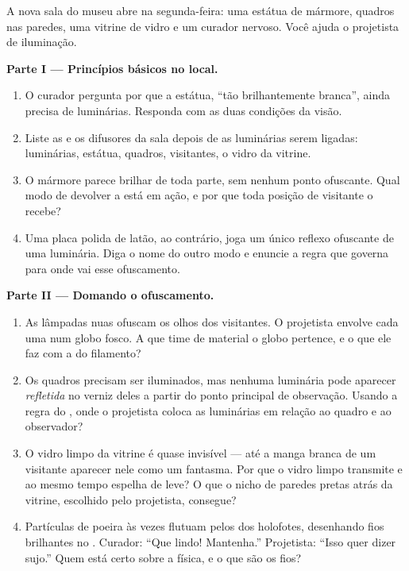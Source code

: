 \begin{problem}\label{pb:g7:light-sources-propagation:1}
A nova sala do museu abre na segunda-feira: uma estátua de mármore,
quadros nas paredes, uma vitrine de vidro e um curador nervoso. Você
ajuda o projetista de iluminação.

\medskip\noindent\textbf{Parte I --- Princípios básicos no local.}
\begin{enumerate}
  \item O curador pergunta por que a estátua, ``tão brilhantemente
        branca'', ainda precisa de luminárias. Responda com as duas
        condições da visão.
  \item Liste as  e os difusores da sala depois de as
        luminárias serem ligadas: luminárias, estátua, quadros,
        visitantes, o vidro da vitrine.
  \item O mármore parece brilhar de toda parte, sem nenhum ponto
        ofuscante. Qual modo de devolver a  está em ação, e por
        que toda posição de visitante o recebe?
  \item Uma placa polida de latão, ao contrário, joga um único
        reflexo ofuscante de uma luminária. Diga o nome do outro modo
        e enuncie a regra que governa para onde vai esse ofuscamento.
\end{enumerate}

\medskip\noindent\textbf{Parte II --- Domando o ofuscamento.}
\begin{enumerate}[resume]
  \item As lâmpadas nuas ofuscam os olhos dos visitantes. O
        projetista envolve cada uma num globo fosco. A que time de
        material o globo pertence, e o que ele faz com a  do
        filamento?
  \item Os quadros precisam ser iluminados, mas nenhuma luminária
        pode aparecer \emph{refletida} no verniz deles a partir do
        ponto principal de observação. Usando a regra do ,
        onde o projetista coloca as luminárias em relação ao quadro e
        ao observador?
  \item O vidro limpo da vitrine é quase invisível --- até a manga
        branca de um visitante aparecer nele como um fantasma. Por
        que o vidro limpo transmite e ao mesmo tempo espelha de leve?
        O que o nicho de paredes pretas atrás da vitrine, escolhido
        pelo projetista, consegue?
  \item Partículas de poeira às vezes flutuam pelos  dos
        holofotes, desenhando fios brilhantes no . Curador: ``Que
        lindo! Mantenha.'' Projetista: ``Isso quer dizer  sujo.''
        Quem está certo sobre a física, e o que são os fios?
\end{enumerate}


\end{problem}
